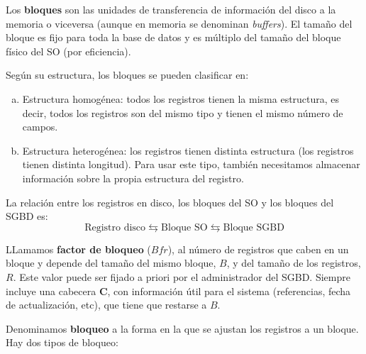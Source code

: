 Los \textbf{bloques} son las unidades de transferencia de información del disco a la memoria o viceversa (aunque en memoria se denominan \textit{buffers}). El tamaño del bloque es fijo para toda la base de datos y es múltiplo del tamaño del bloque físico del SO (por eficiencia).

Según su estructura, los bloques se pueden clasificar en:
\begin{enumerate}[(a)]
\item Estructura homogénea: todos los registros tienen la misma estructura, es decir, todos los registros son del mismo tipo y tienen el mismo número de campos.
\item Estructura heterogénea: los registros tienen distinta estructura (los registros tienen distinta longitud). Para usar este tipo, también necesitamos almacenar información sobre la propia estructura del registro.
\end{enumerate}

La relación entre los registros en disco, los bloques del SO y los bloques del SGBD es:
\[
\text{Registro disco} \leftrightarrows \text{Bloque SO} \leftrightarrows \text{Bloque SGBD}
\]

LLamamos \textbf{factor de bloqueo} ($Bfr$), al número de registros que caben en un bloque y depende del tamaño del mismo bloque, $B$, y del tamaño de los registros, $R$. Este valor puede ser fijado a priori por el administrador del SGBD. Siempre incluye una cabecera \textbf{C}, con información útil para el sistema (referencias, fecha de actualización, etc), que tiene que restarse a $B$.

Denominamos \textbf{bloqueo} a la forma en la que se ajustan los registros a un bloque. Hay dos tipos de bloqueo:

